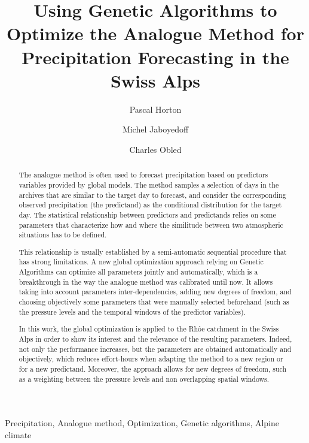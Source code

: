 \documentclass[5p]{elsarticle}
\begin{document}
\begin{frontmatter}

\title{Using Genetic Algorithms to Optimize the Analogue Method for Precipitation Forecasting in the Swiss Alps}

\author[unil,terranum]{Pascal Horton}

\author[unil]{Michel Jaboyedoff}
\author[lthe]{Charles Obled}

\address[unil]{University of Lausanne, Lausanne, Switzerland}
\address[terranum]{Terranum LLC, Rue de l'industrie 35 bis, 1030 Bussigny, Switzerland}
\address[lthe]{Universit\'{e} de Grenoble-Alpes, LTHE, Grenoble, France}

\begin{abstract}
The analogue method is often used to forecast precipitation based on predictors variables provided by global models. The method samples a selection of days in the archives that are similar to the target day to forecast, and consider the corresponding observed precipitation (the predictand) as the conditional distribution for the target day. The statistical relationship between predictors and predictands relies on some parameters that characterize how and where the similitude between two atmospheric situations has to be defined.

This relationship is usually established by a semi-automatic sequential procedure that has strong limitations. A new global optimization approach relying on Genetic Algorithms can optimize all parameters jointly and automatically, which is a breakthrough in the way the analogue method was calibrated until now. It allows taking into account parameters inter-dependencies, adding new degrees of freedom, and choosing objectively some parameters that were manually selected beforehand (such as the pressure levels and the temporal windows of the predictor variables).

In this work, the global optimization is applied to the Rh\^{o}e catchment in the Swiss Alps in order to show its interest and the relevance of the resulting parameters. Indeed, not only the performance increases, but the parameters are obtained automatically and objectively, which reduces effort-hours when adapting the method to a new region or for a new predictand. Moreover, the approach allows for new degrees of freedom, such as a weighting between the pressure levels and non overlapping spatial windows.
\end{abstract}

\begin{keyword}
Precipitation\sep
Analogue method\sep
Optimization\sep
Genetic algorithms\sep
Alpine climate
\end{keyword}

\end{frontmatter}
\end{document}
